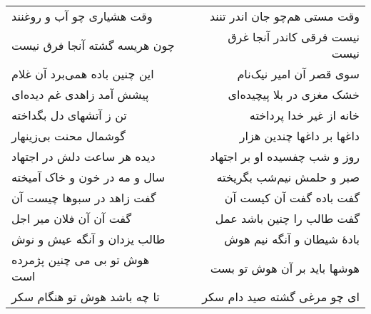 \begin{center}
\begin{longtable}{l p{0.5cm} r}
وقت هشیاری چو آب و روغنند
&&
وقت مستی هم‌چو جان اندر تنند
\\
چون هریسه گشته آنجا فرق نیست
&&
نیست فرقی کاندر آنجا غرق نیست
\\
این چنین باده همی‌برد آن غلام
&&
سوی قصر آن امیر نیک‌نام
\\
پیشش آمد زاهدی غم دیده‌ای
&&
خشک مغزی در بلا پیچیده‌ای
\\
تن ز آتشهای دل بگداخته
&&
خانه از غیر خدا پرداخته
\\
گوشمال محنت بی‌زینهار
&&
داغها بر داغها چندین هزار
\\
دیده هر ساعت دلش در اجتهاد
&&
روز و شب چفسیده او بر اجتهاد
\\
سال و مه در خون و خاک آمیخته
&&
صبر و حلمش نیم‌شب بگریخته
\\
گفت زاهد در سبوها چیست آن
&&
گفت باده گفت آن کیست آن
\\
گفت آن آن فلان میر اجل
&&
گفت طالب را چنین باشد عمل
\\
طالب یزدان و آنگه عیش و نوش
&&
بادهٔ شیطان و آنگه نیم هوش
\\
هوش تو بی می چنین پژمرده است
&&
هوشها باید بر آن هوش تو بست
\\
تا چه باشد هوش تو هنگام سکر
&&
ای چو مرغی گشته صید دام سکر
\\
\end{longtable}
\end{center}
